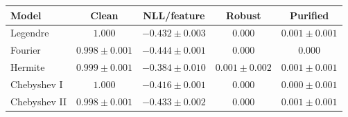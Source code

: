 \begin{tabular}{lcccc}
\toprule
Model & Clean & NLL/feature & Robust & Purified \\
\midrule
Legendre & $1.000$ & $-0.432 \pm 0.003$ & $0.000$ & $0.001 \pm 0.001$ \\
Fourier & $0.998 \pm 0.001$ & $\mathbf{-0.444 \pm 0.001}$ & $0.000$ & $0.000$ \\
Hermite & $0.999 \pm 0.001$ & $-0.384 \pm 0.010$ & $\mathbf{0.001 \pm 0.002}$ & $\mathbf{0.001 \pm 0.001}$ \\
Chebyshev I & $\mathbf{1.000}$ & $-0.416 \pm 0.001$ & $0.000$ & $0.000 \pm 0.001$ \\
Chebyshev II & $0.998 \pm 0.001$ & $-0.433 \pm 0.002$ & $0.000$ & $0.001 \pm 0.001$ \\
\bottomrule
\end{tabular}
